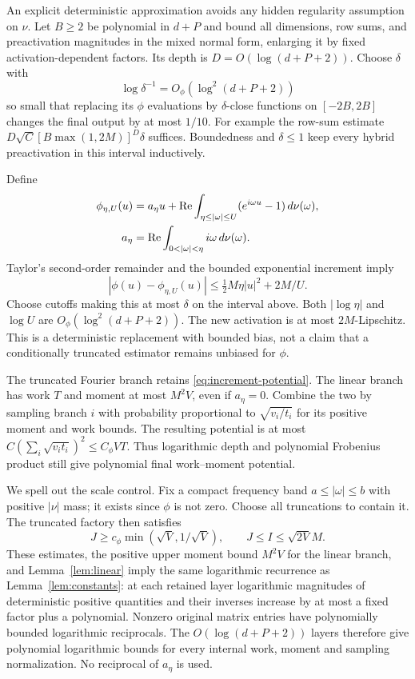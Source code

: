 An explicit deterministic approximation avoids any hidden regularity
assumption on $\nu$. Let $B\ge2$ be polynomial in $d+P$ and bound
all dimensions, row sums, and preactivation magnitudes in the mixed
normal form, enlarging it by fixed activation-dependent factors.
Its depth is $D=O(\log(d+P+2))$. Choose $\delta$ with
\[
 \log\delta^{-1}=O_\phi(\log^2(d+P+2))
\]
so small that replacing its $\phi$ evaluations by $\delta$-close
functions on $[-2B,2B]$ changes the final output by at most $1/10$.
For example the row-sum estimate
$D\sqrt C[B\max(1,2M)]^D\delta$ suffices.
Boundedness and $\delta\le1$ keep every hybrid preactivation in
this interval inductively.

Define
\begin{align*}
 \phi_{\eta,U}(u)&=a_\eta u+\Rea\int_{\eta\le|\omega|\le U}
                            (e^{i\omega u}-1)\,d\nu(\omega),\\
 a_\eta&=\Rea\int_{0<|\omega|<\eta}i\omega\,d\nu(\omega).
\end{align*}
Taylor's second-order remainder and the bounded exponential increment
imply
\begin{equation}\label{eq:frequency-truncation}
 |\phi(u)-\phi_{\eta,U}(u)|
 \le\tfrac12M\eta|u|^2+2M/U.
\end{equation}
Choose cutoffs making this at most $\delta$ on the interval above.
Both $|\log\eta|$ and $\log U$ are
$O_\phi(\log^2(d+P+2))$. The new activation is at most
$2M$-Lipschitz. This is a deterministic replacement with bounded
bias, not a claim that a conditionally truncated estimator remains
unbiased for $\phi$.

The truncated Fourier branch retains
\eqref{eq:increment-potential}. The linear branch has work $T$ and
moment at most $M^2V$, even if $a_\eta=0$. Combine the two by sampling
branch $i$ with probability proportional to $\sqrt{v_i/t_i}$ for
its positive moment and work bounds. The resulting potential is at
most $C(\sum_i\sqrt{v_it_i})^2\le C_\phi VT$.
Thus logarithmic depth and polynomial Frobenius product still give
polynomial final work--moment potential.

We spell out the scale control. Fix a compact frequency band
$a\le|\omega|\le b$ with positive $|\nu|$ mass; it exists since
$\phi$ is not zero. Choose all truncations to contain it. The
truncated factory then satisfies
\[
 J\ge c_\phi\min(\sqrt V,1/\sqrt V),\qquad
 J\le I\le\sqrt{2V}M.
\]
These estimates, the positive upper moment bound $M^2V$ for the
linear branch, and Lemma~\ref{lem:linear} imply the same logarithmic
recurrence as Lemma~\ref{lem:constants}: at each retained layer
logarithmic magnitudes of deterministic positive quantities and their
inverses increase by at most a fixed factor plus a polynomial.
Nonzero original matrix entries have polynomially bounded logarithmic
reciprocals. The $O(\log(d+P+2))$ layers therefore give polynomial
logarithmic bounds for every internal work, moment and sampling
normalization. No reciprocal of $a_\eta$ is used.

